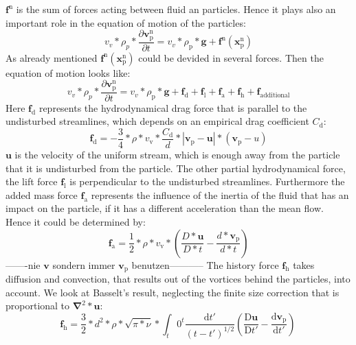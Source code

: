 \documentclass[a4paper,12pt]{article}
\renewcommand*\vec[1]{\boldsymbol{#1}}
\numberwithin{equation}{section} %
\begin{document}
$\vec{f^\mathrm{n}}$ is the sum of forces acting between fluid an particles.
Hence it plays also an important role in the equation of motion of the particles:
\begin{equation}
v_v*\rho_p* \frac{\partial{\vec{v_\mathrm{p}^\mathrm{n}}}}{\partial{t}} = v_v*\rho_\mathrm{p}*\vec{g}+\vec{f^\mathrm{n}(\vec{x_\mathrm{p}^\mathrm{n}})}
\end{equation}
As already mentioned $\vec{f^\mathrm{n}(\vec{x_\mathrm{p}^\mathrm{n}})}$ could be devided in several forces. Then the equation of motion looks like:
\begin{equation}
v_v*\rho_p* \frac{\partial{\vec{v_\mathrm{p}^\mathrm{n}}}}{\partial{t}} = v_v*\rho_\mathrm{p}*\vec{g}+\vec{f_\mathrm{d}}+\vec{f_\mathrm{l}}+\vec{f_\mathrm{a}}+\vec{f_\mathrm{h}}+\vec{f_\mathrm{additional}}
\end{equation}
Here $\vec{f_\mathrm{d}}$ represents the hydrodynamical drag force that is parallel to the undisturbed streamlines, which depends on an empirical drag coefficient $C_{\mathrm{d}} $:
\begin{equation}
\vec{f_\mathrm{d}}=-\frac{3}{4}*\rho*v_\mathrm{v}*\frac{C_\mathrm{d}}{d}*|\vec{v_\mathrm{p}}-\vec{u}|*(\vec{v_\mathrm{p}}-u)
\end{equation}
$\vec{u}$ is the velocity of the uniform stream, which is enough away from the particle that it is undisturbed from the particle.
The other partial hydrodynamical force, the lift force $\vec{f_\mathrm{l}}$ is perpendicular to the undisturbed streamlines.
Furthermore the added mass force $\vec{f_\mathrm{a}}$ represents the influence of the inertia of the fluid that has an impact on the particle, if it has a different acceleration than the mean flow.
Hence it could be determined by:
\begin{equation}
\vec{f_\mathrm{a}} =  \frac{1}{2}*\rho*v_\mathrm{v}*(\frac{D*\vec{u}}{D*t}-\frac{d*\vec{v_\mathrm{p}}}{d*t})
\end{equation}
-------nie $\vec{v}$ sondern immer $\vec{v_\mathrm{p}}$ benutzen-----------
The history force $\vec{f_\mathrm{h}}$ takes diffusion and convection, that results out of the vortices behind the particles, into account. We look at Basselt's result, neglecting the finite size correction that is proportional to $\vec\nabla^\mathrm{2}*\vec{u}$:
\begin{equation}
\vec{f_\mathrm{h}} = \frac{3}{2}*d^\mathrm{2}*\rho*\sqrt{\pi*\nu}*\int_t\mathrm{0}^t \frac{\mathrm{d}t'}{(t-t')^\mathrm{1/2}} (\frac{\mathrm{D}\vec{u}}{\mathrm{D}t'}- \frac{\mathrm{d}\vec{v_\mathrm{p}}}{\mathrm{d}t'}) \, 
\end{equation}
\end{document}
